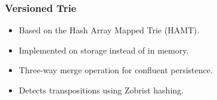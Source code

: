 \begin{frame}[fragile]
	\frametitle{Versioned Trie}

	\begin{itemize}
		\item Based on the Hash Array Mapped Trie (HAMT).
		\item Implemented on storage instead of in memory.
		\item Three-way merge operation for confluent persistence.
		\item Detects transpositions using Zobrist hashing.
	\end{itemize}

\end{frame}
